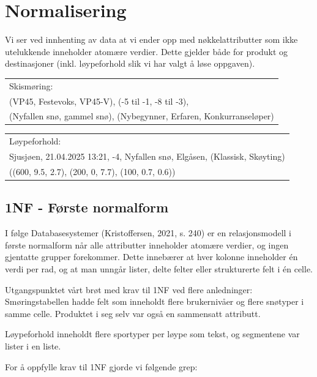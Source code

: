 \documentclass[10pt, a4paper]{article}
\begin{document}
\section{Normalisering}

Vi ser ved innhenting av data at vi ender opp med nøkkelattributter som ikke utelukkende inneholder atomære verdier. Dette gjelder både for produkt og destinasjoner (inkl. løypeforhold slik vi har valgt å løse oppgaven).

\begin{table}[h!]
\begin{tabular}{l}
Skismøring: \\
\small{(VP45, Festevoks, VP45-V), (-5 til -1, -8 til -3),} \\
\small{(Nyfallen snø, gammel snø), (Nybegynner, Erfaren, Konkurranseløper)}
\end{tabular}
\end{table}

\begin{table}[h!]
\begin{tabular}{l}
Løypeforhold: \\
\small{Sjusjøen, 21.04.2025 13:21, -4, Nyfallen snø, Elgåsen, (Klassisk, Skøyting)} \\
\small{((600, 9.5, 2.7), (200, 0, 7.7), (100, 0.7, 0.6))}
\end{tabular}
\end{table}

\subsection{1NF - Første normalform}

I følge Databasesystemer (Kristoffersen, 2021, s. 240) er en relasjonsmodell i første normalform når alle attributter inneholder atomære verdier, og ingen gjentatte grupper forekommer. Dette innebærer at hver kolonne inneholder én verdi per rad, og at man unngår lister, delte felter eller strukturerte felt i én celle.

Utgangspunktet vårt brøt med krav til 1NF ved flere anledninger: \\

Smøringstabellen hadde felt som inneholdt flere brukernivåer og flere snøtyper i samme celle. Produktet i seg selv var også en sammensatt attributt.

Løypeforhold inneholdt flere sportyper per løype som tekst, og segmentene var lister i en liste.

For å oppfylle krav til 1NF gjorde vi følgende grep:
\end{document}
